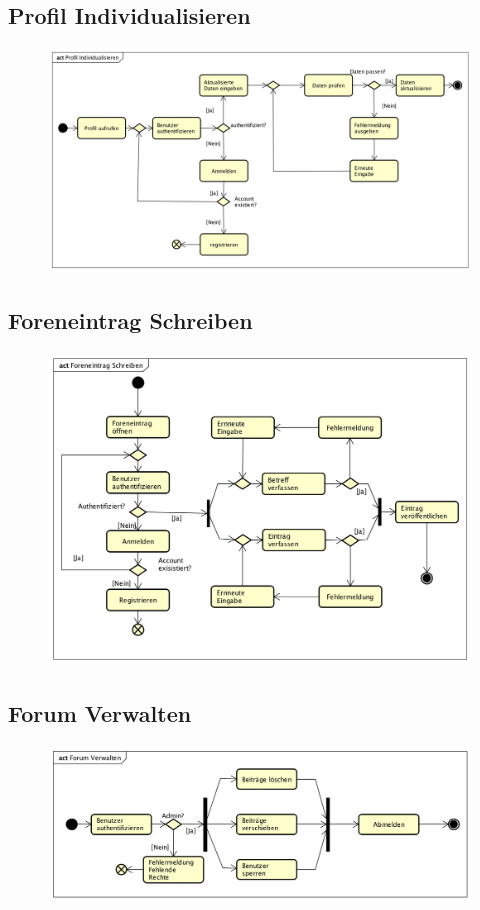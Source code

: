 \subsection*{Profil Individualisieren}
\begin{figure}[h]
	\centering
	\includegraphics[width=0.8\linewidth]{docs/3_Aktivitaetsdiagramme/Patrick/Profil_Individualisieren.png}
	\label{fig:ActDia_Profil_Individualisieren}
\end{figure}

\subsection*{Foreneintrag Schreiben}
\begin{figure}[h]
	\centering
	\includegraphics[width=0.8\linewidth]{docs/3_Aktivitaetsdiagramme/Patrick/Foreneintrag_Schreiben.png}
	\label{fig:ActDia_Foreneinntrag_Schreiben}
\end{figure}

\newpage

\subsection*{Forum Verwalten}
\begin{figure}[h]
	\centering
	\includegraphics[width=0.8\linewidth]{docs/3_Aktivitaetsdiagramme/Patrick/Forum_Verwalten.png}
	\label{fig:ActDia_Forum_Verwalten}
\end{figure}
